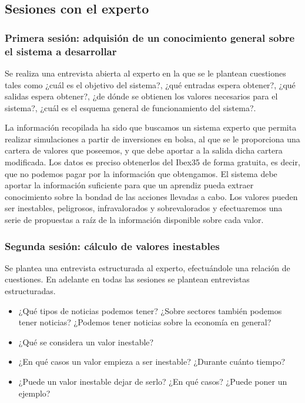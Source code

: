 \documentclass[a4paper,11pt]{article}
\begin{document}
\subsection{Sesiones con el experto}
  
\subsubsection{Primera sesión: adquisión de un conocimiento general sobre el sistema a desarrollar}

Se realiza una entrevista abierta al experto en la que se le plantean cuestiones tales como ¿cuál es el objetivo del sistema?,
¿qué entradas espera obtener?, ¿qué salidas espera obtener?, ¿de dónde se obtienen los valores necesarios para el sistema?,
¿cuál es el esquema general de funcionamiento del sistema?.

La información recopilada ha sido que buscamos un sistema experto que permita realizar simulaciones a partir de inversiones en bolsa,
al que se le proporciona una cartera de valores que poseemos, y que debe aportar a la salida dicha cartera modificada. 
Los datos es preciso obtenerlos del Ibex35 de forma gratuita, es decir, que no podemos pagar por la información que obtengamos.
El sistema debe aportar la información suficiente para que un aprendiz pueda extraer conocimiento sobre la bondad de las acciones
llevadas a cabo. Los valores pueden ser inestables, peligrosos, infravalorados y sobrevalorados y efectuaremos
una serie de propuestas a raíz de la información disponible sobre cada valor.

\subsubsection{Segunda sesión: cálculo de valores inestables}

Se plantea una entrevista estructurada al experto, efectuándole una relación de cuestiones. En adelante en todas las sesiones
se plantean entrevistas estructuradas.

\begin{itemize}
 \item ¿Qué tipos de noticias podemos tener? ¿Sobre sectores también podemos tener noticias?
  ¿Podemos tener noticias sobre la economía en general?
 \item ¿Qué se considera un valor inestable?
 \item ¿En qué casos un valor empieza a ser inestable? ¿Durante cuánto tiempo?
 \item ¿Puede un valor inestable dejar de serlo? ¿En qué casos? ¿Puede poner un ejemplo?
\end{itemize}
\end{document}
